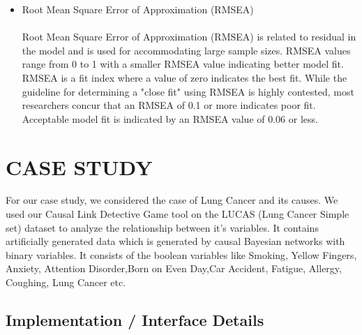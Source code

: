 \documentclass{vgtc}                          %
\begin{document}
\begin {itemize}
 
\item Root Mean Square Error of Approximation (RMSEA)
\paragraph{}
Root Mean Square Error of Approximation (RMSEA) is related to residual in the model and is used for accommodating large sample sizes.
RMSEA values range from 0 to 1 with a smaller RMSEA value indicating better model fit.
RMSEA is a fit index where a value of zero indicates the best fit. While the guideline for determining a "close fit" using RMSEA is highly contested, most researchers concur that an RMSEA of 0.1 or more indicates poor fit. Acceptable model fit is indicated by an RMSEA value of 0.06 or less. 
\end{itemize}

\section{CASE STUDY}

For our case study, we considered the case of Lung Cancer and its causes. We used our Causal Link Detective Game tool on the LUCAS (Lung Cancer Simple set) dataset to analyze the relationship between it's variables. It contains artificially generated data which is generated by causal Bayesian networks with binary variables. It consists of the boolean variables like Smoking, Yellow Fingers, Anxiety, Attention Disorder,Born on Even Day,Car Accident, Fatigue, Allergy, Coughing, Lung Cancer etc.

\subsection{Implementation / Interface Details}
\end{document}
